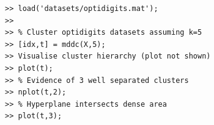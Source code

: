 \documentclass{book}
\begin{document}
\begin{verbatim}
>> load('datasets/optidigits.mat');
>>
>> % Cluster optidigits datasets assuming k=5
>> [idx,t] = mddc(X,5);
>> Visualise cluster hierarchy (plot not shown)
>> plot(t);
>> % Evidence of 3 well separated clusters
>> nplot(t,2);
>> % Hyperplane intersects dense area
>> plot(t,3);
\end{verbatim}

\begin{figure}
%
\begin{latexonly}
%
\begin{center}
%
%

\end{center}
\end{latexonly}
\end{figure}
\end{document}
